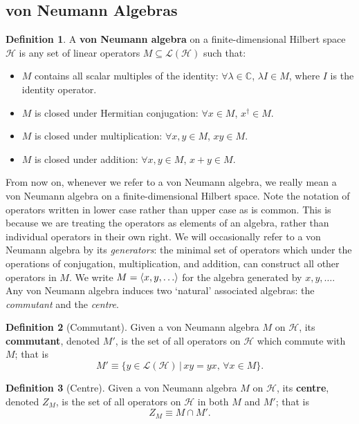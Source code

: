\documentclass[12pt,a4paper]{report}
\numberwithin{equation}{section}
\theoremstyle{definition}
\newtheorem{definition}{Definition}[section]
\theoremstyle{theorem}
\theoremstyle{theorem}
\theoremstyle{example}
\theoremstyle{definition}
\begin{document}
\subsection{von Neumann Algebras}
\begin{definition}
	A \textbf{von Neumann algebra} on a finite-dimensional Hilbert space $\mathcal{H}$ is any set of linear operators $M\subseteq\mathcal{L}(\mathcal{H})$ such that:
	\begin{itemize}
		\item $M$ contains all scalar multiples of the identity: $\forall \lambda\in\mathbb{C}$, $\lambda I\in M$, where $I$ is the identity operator.
		\item $M$ is closed under Hermitian conjugation: $\forall x\in M$, $x^{\dagger}\in M$.
		\item $M$ is closed under multiplication: $\forall x,y\in M$, $xy\in M$.
		\item $M$ is closed under addition: $\forall x,y\in M$, $x+y\in M$.
	\end{itemize}
\end{definition}
From now on, whenever we refer to a von Neumann algebra, we really mean a von Neumann algebra on a finite-dimensional Hilbert space. Note the notation of operators written in lower case rather than upper case as is common. This is because we are treating the operators as elements of an algebra, rather than individual operators in their own right. We will occasionally refer to a von Neumann algebra by its \textit{generators}: the minimal set of operators which under the operations of conjugation, multiplication, and addition, can construct all other operators in $M$. We write $M=\braket{x,y,\ldots}$ for the algebra generated by $x,y,\ldots$.\\
Any von Neumann algebra induces two `natural' associated algebras: the \textit{commutant} and the \textit{centre}.
\begin{definition}[Commutant]
	Given a von Neumann algebra $M$ on $\mathcal{H}$, its \textbf{commutant}, denoted $M'$, is the set of all operators on $\mathcal{H}$ which commute with $M$; that is
	\begin{equation}
		M'\equiv\{y\in\mathcal{L}(\mathcal{H})\,|\,xy=yx,\,\forall x\in M\}.
	\end{equation}
\end{definition}
\begin{definition}[Centre]
	Given a von Neumann algebra $M$ on $\mathcal{H}$, its \textbf{centre}, denoted $Z_{M}$, is the set of all operators on $\mathcal{H}$ in both $M$ and $M'$; that is
	\begin{equation}
		Z_{M}\equiv M\cap M'.
	\end{equation}
\end{definition}
\end{document}
